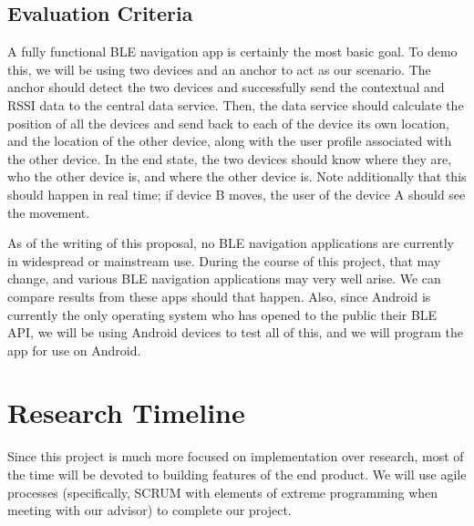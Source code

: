 \documentclass{sig-alternate}
\begin{document}
\subsection{Evaluation Criteria}
\label{subsec:eval_criteria}
A fully functional BLE navigation app is certainly the most basic goal.
To demo this, we will be using two devices and an anchor to act as
our scenario. The anchor should detect the two devices and 
successfully send the contextual and RSSI data to the central
data service. Then, the data service should calculate the position
of all the devices and send back to each of the device its own location,
and the location of the other device, along with the user profile associated
with the other device.
In the end state, the two devices should know where they are, who 
the other device is, and where the other device is. Note additionally
that this should happen in real time; if device B moves, the user 
of the device A should see the movement.

As of the writing of this proposal, no BLE navigation applications are 
currently in widespread or mainstream use. During the course of
this project, that may change, and various BLE navigation applications 
may very well arise. We can compare results from these apps should
that happen. Also, since Android is currently the only operating system
who has opened to the public their BLE API, we will be using Android
devices to test all of this, and we will program the app for use on 
Android.


\section{Research Timeline}
\label{sec:research_timeline}
Since this project is much more focused on implementation over
research, most of the time will be devoted to building features of 
the end product. We will use agile processes (specifically, SCRUM 
with elements of extreme programming when meeting with our 
advisor) to complete our project.
\end{document}
